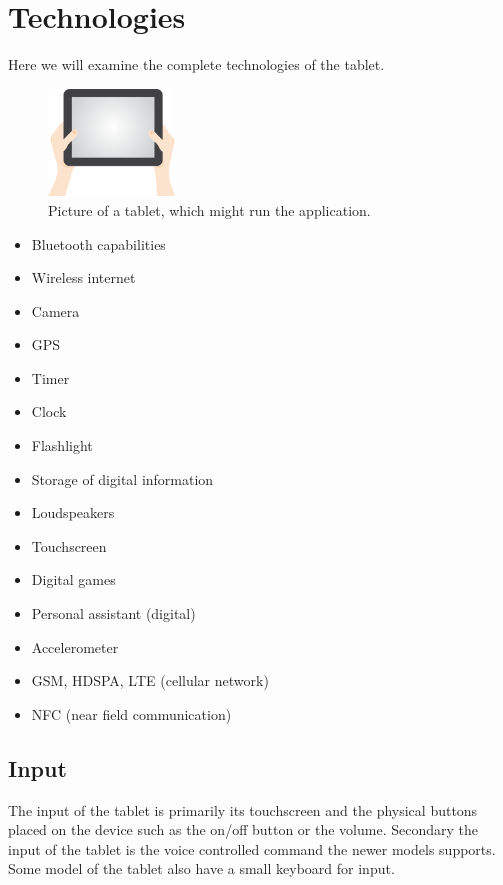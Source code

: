 \section{Technologies}
Here we will examine the complete technologies of the tablet.

\begin{figure}
\centering
\includegraphics[width=0.3\textwidth, keepaspectratio]{images/pact/tablet}
\caption{\label{fig:technologies}Picture of a tablet, which might run the application.}
\end{figure}
\begin{itemize}[noitemsep]
    \item Bluetooth capabilities
    \item Wireless internet 
    \item Camera
    \item GPS
    \item Timer 
    \item Clock 
    \item Flashlight 
    \item Storage of digital information 
    \item Loudspeakers 
    \item Touchscreen
    \item Digital games 
    \item Personal assistant (digital)
    \item Accelerometer
    \item GSM, HDSPA, LTE (cellular network)
    \item NFC (near field communication)
\end{itemize}

\subsection{Input}
The input of the tablet is primarily its touchscreen and the physical buttons placed on the device such as the on/off button or the volume. Secondary the input of the tablet is the voice controlled command the newer models supports. Some model of the tablet also have a small keyboard for input.

